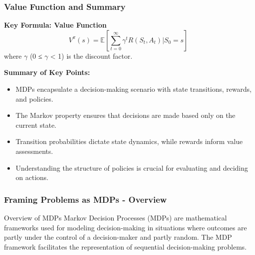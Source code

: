\documentclass{beamer}
\begin{document}
\begin{frame}[fragile]
    \frametitle{Value Function and Summary}
    \textbf{Key Formula: Value Function}
    \begin{equation}
        V^\pi(s) = \mathbb{E} \left[ \sum_{t=0}^{\infty} \gamma^t R(S_t, A_t) | S_0 = s \right]
    \end{equation}
    where $\gamma$ (0 ≤ $\gamma$ < 1) is the discount factor.

    \textbf{Summary of Key Points:}
    \begin{itemize}
        \item MDPs encapsulate a decision-making scenario with state transitions, rewards, and policies.
        \item The Markov property ensures that decisions are made based only on the current state.
        \item Transition probabilities dictate state dynamics, while rewards inform value assessments.
        \item Understanding the structure of policies is crucial for evaluating and deciding on actions.
    \end{itemize}
\end{frame}

\begin{frame}[fragile]
    \frametitle{Framing Problems as MDPs - Overview}
    \begin{block}{Overview of MDPs}
        Markov Decision Processes (MDPs) are mathematical frameworks used for modeling decision-making in situations where outcomes are partly under the control of a decision-maker and partly random. The MDP framework facilitates the representation of sequential decision-making problems.
    \end{block}
\end{frame}
\end{document}
